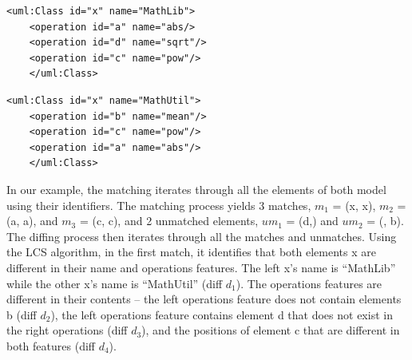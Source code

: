 \documentclass{llncs}
\begin{document}
\vspace{-10pt}
\begin{minipage}[t]{0.49\linewidth} 
    \begin{lstlisting}[style=eol,caption={The simplified XMI of the left model in Fig. \ref{fig:left}.},label=lst:leftxmi]
    <uml:Class id="x" name="MathLib">
    <operation id="a" name="abs/>
    <operation id="d" name="sqrt"/>
    <operation id="c" name="pow"/>
    </uml:Class>
    \end{lstlisting}
\end{minipage}
\hfill
\begin{minipage}[t]{0.49\linewidth}
    \begin{lstlisting}[style=eol,caption={The simplified XMI of the right model in Fig. \ref{fig:right}.},label=lst:rightxmi]
    <uml:Class id="x" name="MathUtil">
    <operation id="b" name="mean"/>
    <operation id="c" name="pow"/>
    <operation id="a" name="abs"/>
    </uml:Class>
    \end{lstlisting}
\end{minipage}

In our example, the matching iterates through all the elements of both model using their identifiers. The matching process yields 3 matches, $m_1$ = (\textsf{x}, \textsf{x}), $m_2$ = (\textsf{a}, \textsf{a}), and $m_3$ = (\textsf{c}, \textsf{c}), and 2 unmatched elements, $um_1$ = (\textsf{d},) and $um_2$ = (, \textsf{b}). The diffing process then iterates through all the matches and unmatches. Using the LCS algorithm, in the first match, it identifies that both elements \textsf{x} are different in their \textsf{name} and \textsf{operations} features. 
The left \textsf{x}'s \textsf{name} is ``MathLib'' while the other \textsf{x}'s \textsf{name} is ``MathUtil'' (diff $d_1$). The \textsf{operations} features are different in their contents -- the left \textsf{operations} feature does not contain elements \textsf{b} (diff $d_2$), the left \textsf{operations} feature contains element \textsf{d} 
that does not exist in the right \textsf{operations} (diff $d_3$), and the positions of element \textsf{c} that are different in both features (diff $d_4$).
\end{document}
